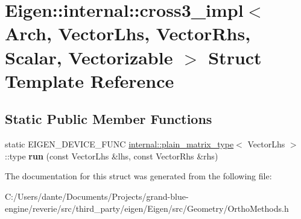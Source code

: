 \hypertarget{struct_eigen_1_1internal_1_1cross3__impl}{}\section{Eigen\+::internal\+::cross3\+\_\+impl$<$ Arch, Vector\+Lhs, Vector\+Rhs, Scalar, Vectorizable $>$ Struct Template Reference}
\label{struct_eigen_1_1internal_1_1cross3__impl}
\subsection*{Static Public Member Functions}
\begin{DoxyCompactItemize}
\item 
\mbox{\label{struct_eigen_1_1internal_1_1cross3__impl_a72c955c132e31e90f2455c81cf1ad62c}} 
static E\+I\+G\+E\+N\+\_\+\+D\+E\+V\+I\+C\+E\+\_\+\+F\+U\+NC \mbox{\hyperlink{struct_eigen_1_1internal_1_1plain__matrix__type}{internal\+::plain\+\_\+matrix\+\_\+type}}$<$ Vector\+Lhs $>$\+::type {\bfseries run} (const Vector\+Lhs \&lhs, const Vector\+Rhs \&rhs)
\end{DoxyCompactItemize}


The documentation for this struct was generated from the following file\+:\begin{DoxyCompactItemize}
\item 
C\+:/\+Users/dante/\+Documents/\+Projects/grand-\/blue-\/engine/reverie/src/third\+\_\+party/eigen/\+Eigen/src/\+Geometry/Ortho\+Methods.\+h\end{DoxyCompactItemize}

